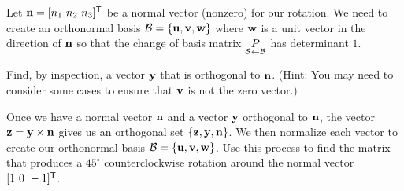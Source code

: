 \begin{pactivity} \label{act:rot_general} Let $\mathbf{n} = [n_1 \ n_2 \ n_3]^{\mathsf{T}}$ be a normal vector (nonzero) for our rotation. We need to create an orthonormal basis $\mathcal{B} = \{\mathbf{u}, \mathbf{v}, \mathbf{w}\}$ where $\mathbf{w}$ is a unit vector in the direction of $\mathbf{n}$ so that the change of basis matrix $\underset{\mathcal{S} \leftarrow \mathcal{B}}{P}$ has determinant $1$. 
\ba
\item Find, by inspection, a vector $\mathbf{y}$ that is orthogonal to $\mathbf{n}$. (Hint: You may need to consider some cases to ensure that $\mathbf{v}$ is not the zero vector.) 


\item Once we have a normal vector $\mathbf{n}$ and a vector $\mathbf{y}$ orthogonal to $\mathbf{n}$, the vector $\mathbf{z} = \mathbf{y} \times \mathbf{n}$ gives us an orthogonal set $\{\mathbf{z}, \mathbf{y}, \mathbf{n}\}$. We then normalize each vector to create our orthonormal basis $\mathcal{B} = \{\mathbf{u}, \mathbf{v}, \mathbf{w}\}$. Use this process to find the matrix that produces a $45^{\circ}$ counterclockwise rotation around the normal vector $[1 \ 0 \ -1]^{\mathsf{T}}$. 

\ea

\end{pactivity}
